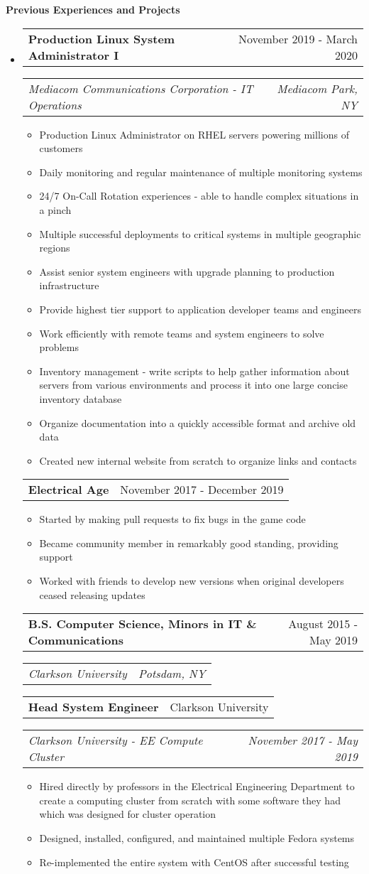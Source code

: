 \documentclass[letterpaper,12pt]{article}
\makeatletter
\newcommand{\resitem}[1]{\item #1 \vspace{-3pt}}
\newcommand{\resheading}[1]{{\large {\textbf{#1 \vphantom{p\^{E}}}}}\vspace{-3pt}}
\newcommand{\topheading}[2]{
\begin{tabular*}{6.5in}{l@{\extracolsep{\fill}}r}
		\textbf{#1} & #2 \\
\end{tabular*}}
\newcommand{\bottomheading}[2]{
\begin{tabular*}{6.5in}{l@{\extracolsep{\fill}}r}
		\textit{#1} & \textit{#2} \\
\end{tabular*}\vspace{-6pt}}
\newcommand{\singleheading}[2]{
\vspace{6pt}
\begin{tabular*}{6.5in}{l@{\extracolsep{\fill}}r}
		\textbf{#1} & #2 \\
\end{tabular*}
\vspace{-3pt}
}
\makeatother
\begin{document}
\resheading{Previous Experiences and Projects}
\begin{itemize}
	\item[]

	\topheading{Production Linux System Administrator I}{November 2019 - March 2020}
	\bottomheading{Mediacom Communications Corporation - IT Operations}{Mediacom Park, NY}
	\begin{itemize}
		\resitem{Production Linux Administrator on RHEL servers powering millions of customers}
		\resitem{Daily monitoring and regular maintenance of multiple monitoring systems}
		\resitem{24/7 On-Call Rotation experiences - able to handle complex situations in a pinch}
		\resitem{Multiple successful deployments to critical systems in multiple geographic regions}
		\resitem{Assist senior system engineers with upgrade planning to production infrastructure}
		\resitem{Provide highest tier support to application developer teams and engineers}
		\resitem{Work efficiently with remote teams and system engineers to solve problems}
		\resitem{Inventory management - write scripts to help gather information about servers from various environments and process it into one large concise inventory database}
		\resitem{Organize documentation into a quickly accessible format and archive old data}
		\resitem{Created new internal website from scratch to organize links and contacts}
	\end{itemize}

	\singleheading{Electrical Age}{November 2017 - December 2019}
	\begin{itemize}
		\resitem{Started by making pull requests to fix bugs in the game code}
		\resitem{Became community member in remarkably good standing, providing support}
		\resitem{Worked with friends to develop new versions when original developers ceased releasing updates}
	\end{itemize}

	\vspace{6pt}

	\topheading{B.S. Computer Science, Minors in IT \& Communications}{August 2015 - May 2019}
	\bottomheading{Clarkson University}{Potsdam, NY}

	\vspace{6pt}

	\topheading{Head System Engineer}{Clarkson University}
	\bottomheading{Clarkson University - EE Compute Cluster}{November 2017 - May 2019}
	\begin{itemize}
		\resitem{Hired directly by professors in the Electrical Engineering Department to create a computing cluster from scratch with some software they had which was designed for cluster operation}
		\resitem{Designed, installed, configured, and maintained multiple Fedora systems}
		\resitem{Re-implemented the entire system with CentOS after successful testing}
	\end{itemize}


\end{itemize}
\end{document}
